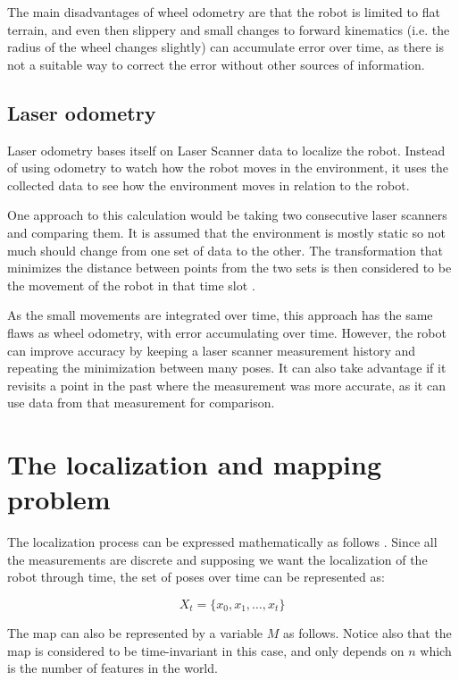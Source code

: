 The main disadvantages of wheel odometry are that the robot is limited to flat terrain, and even then slippery and small changes to forward kinematics (i.e. the radius of the wheel changes slightly) can accumulate error over time, as there is not a suitable way to correct the error without other sources of information.

\subsection{Laser odometry}

Laser odometry bases itself on Laser Scanner data to localize the robot. Instead of using odometry to watch how the robot moves in the environment, it uses the collected data to see how the environment moves in relation to the robot.

One approach to this calculation would be taking two consecutive laser scanners and comparing them. It is assumed that the environment is mostly static so not much should change from one set of data to the other. The transformation that minimizes the distance between points from the two sets is then considered to be the movement of the robot in that time slot \cite{Jaimez_et_al_ICRA2016}.

As the small movements are integrated over time, this approach has the same flaws as wheel odometry, with error accumulating over time. However, the robot can improve accuracy by keeping a laser scanner measurement history and repeating the minimization between many poses. It can also take advantage if it revisits a point in the past where the measurement was more accurate, as it can use data from that measurement for comparison.

\section{The localization and mapping problem}

The localization process can be expressed mathematically as follows \cite{thrun2005probabilistic}. Since all the measurements are discrete and supposing we want the localization of the robot through time, the set of poses over time can be represented as:

\begin{equation}\label{eq:x}
    X_t = \{x_0, x_1, \dots, x_t\} 
\end{equation}

The map can also be represented by a variable $M$ as follows. Notice also that the map is considered to be time-invariant in this case, and only depends on $n$ which is the number of features in the world.

